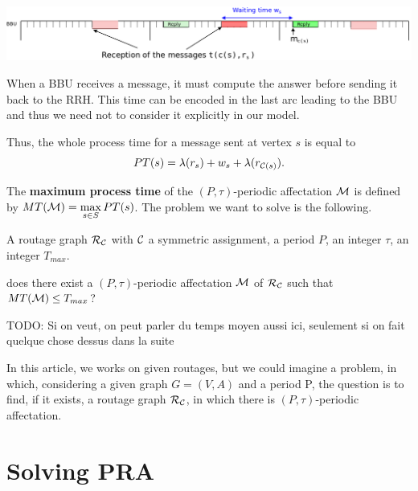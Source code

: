 \documentclass[a4paper,10pt]{article}
\newcommand{\todo}[1]{{\color{red} TODO: {#1}}}
\begin{document}
       \begin{center}
      \includegraphics[scale=0.3]{BBU2.png}
      \end{center}
     

      When a BBU receives a message, it must compute the answer before sending it back to the RRH. This time can be encoded
      in the last arc leading to the BBU and thus we need not to consider it explicitly in our model.
    
      Thus, the whole process time for a message sent at vertex $s$ is equal to
      $$
      PT(s)=\lambda(r_s)+ w_s+\lambda(r_{{\cal C}(s)}).
      $$
      
    The {\bf maximum process time} of the $(P,\tau)$-periodic affectation ${\cal M} $ is defined by $MT({\cal M})=\max\limits_{s \in S} PT(s)$. The problem we want to solve is the following. 


        A routage graph ${\cal R}_{\cal C}$ with ${\cal C}$ a symmetric assignment, a period $P$, an integer $\tau$, an integer $T_{max}$.

       does there exist a $(P,\tau)$-periodic affectation ${\cal M}$ of ${\cal R}_{\cal C}$ such that $MT({\cal M}) \leq T_{max}$?

      \todo{Si on veut, on peut parler du temps moyen aussi ici, seulement si on fait quelque chose dessus dans la suite}



  In this article, we works on given routages, but we could imagine a problem, in which, considering a given graph $G = (V,A)$ and a period P, the question is to find, if it exists, a routage graph ${\cal R}_{\cal C}$, in which there is $(P,\tau)$-periodic affectation.
\section{Solving PRA}
  \label{sec:complexity}
\end{document}
